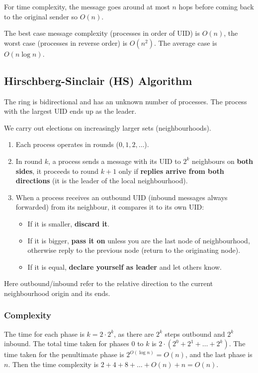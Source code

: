 \documentclass[11pt]{article}
\begin{document}
For time complexity, the message goes around at most $n$ hops before coming back to the original sender so $O(n)$.

The best case message complexity (processes in order of UID) is $O(n)$, the worst case (processes in reverse order) is $O(n^2)$.
The average case is $O(n \log n)$.

\subsection{Hirschberg-Sinclair (HS) Algorithm}
The ring is bidirectional and has an unknown number of processes.
The process with the largest UID ends up as the leader.

We carry out elections on increasingly larger sets (neighbourhoods).

\begin{enumerate}
  \item Each process operates in rounds ($0, 1, 2, \dots$).
  \item In round $k$, a process sends a message with its UID to $2^k$ neighbours on \textbf{both sides}, it proceeds to round $k + 1$ only if \textbf{replies arrive from both directions} (it is the leader of the local neighbourhood).
  \item When a process receives an outbound UID (inbound messages always forwarded) from its neighbour, it compares it to its own UID:
    \begin{itemize}
      \item If it is smaller, \textbf{discard it}.
      \item If it is bigger, \textbf{pass it on} unless you are the last node of neighbourhood, otherwise reply to the previous node (return to the originating node).
      \item If it is equal, \textbf{declare yourself as leader} and let others know.
    \end{itemize}
\end{enumerate}
Here outbound/inbound refer to the relative direction to the current neighbourhood origin and its ends.

\subsubsection{Complexity}
The time for each phase is $k = 2 \cdot 2^k$, as there are $2^k$ steps outbound and $2^k$ inbound.
The total time taken for phases $0$ to $k$ is $2 \cdot (2^0 + 2^1 + \dots + 2^k)$.
The time taken for the penultimate phase is $2^{O(\log n)}= O(n)$, and the last phase is $n$.
Then the time complexity is $2 + 4 + 8 + \dots + O(n) + n = O(n)$.
\end{document}
